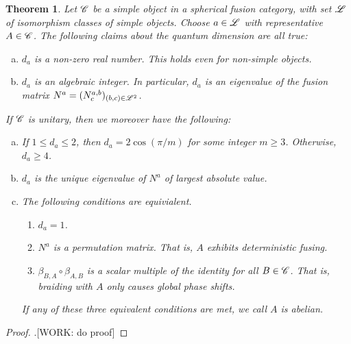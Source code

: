\documentclass{article}
\newtheorem{theorem}{Theorem}[section]
\theoremstyle{definition}
\numberwithin{figure}{section}
\newcounter{quantumdim}
\begin{document}
\begin{theorem}\label{quantum dimensions} Let $\mathscr{C}$ be a simple object in a spherical fusion category, with set $\mathscr{L}$ of isomorphism classes of simple objects. Choose $a\in \mathscr{L}$ with representative $A\in\mathscr{C}$. The following claims about the quantum dimension are all true:

\begin{enumerate}[(a)]
\item $d_a$ is a non-zero real number. This holds even for non-simple objects.

\item $d_a$ is an algebraic integer. In particular, $d_a$ is an eigenvalue of the fusion matrix $N^{a}=(N^{a,b}_c)_{(b,c)\in \mathscr{L}^2}$.

\setcounter{quantumdim}{\value{enumi}}

\end{enumerate}

If $\mathscr{C}$ is unitary, then we moreover have the following:

\begin{enumerate}[(a)]
\setcounter{enumi}{\value{quantumdim}}

\item If $1\leq d_a\leq 2$, then $d_a=2\cos(\pi /m)$ for some integer $m\geq 3$. Otherwise, $d_a\geq 4$.

\item $d_a$ is the unique eigenvalue of $N^a$ of largest absolute value.

\item The following conditions are equivialent.

\begin{enumerate}[1.]
\item $d_a=1$.
\item $N^a$ is a permutation matrix. That is, $A$ exhibits deterministic fusing.
\item $\beta_{B,A}\circ \beta_{A,B}$ is a scalar multiple of the identity for all $B\in \mathscr{C}$. That is, braiding with $A$ only causes global phase shifts.
\end{enumerate}

If any of these three equivalent conditions are met, we call $A$ is \textit{abelian}. 
\end{enumerate}
\end{theorem}
\begin{proof} .[WORK: do proof]
\end{proof}
\end{document}
